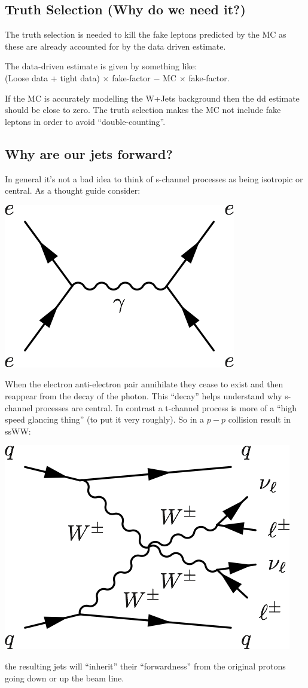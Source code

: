 \documentclass{article}
\begin{document}
\subsection{Truth Selection (Why do we need it?)}
The truth selection is needed to kill the fake leptons predicted by the MC as these are already accounted for by the data driven estimate.

The data-driven estimate is given by something like:\\
(Loose data + tight data) $\times$ fake-factor $-$ MC $\times$ fake-factor.

If the MC is accurately modelling the W+Jets background then the dd estimate should be close to zero. The truth selection makes the MC not include fake leptons in order to avoid ``double-counting''.

\subsection{Why are our jets forward?}
In general it's not a bad idea to think of s-channel processes as being isotropic or central. As a thought guide consider:\\

\centerline{\includegraphics[scale=0.3]{s_channel.png}}

When the electron anti-electron pair annihilate they cease to exist and then reappear from the decay of the photon. This ``decay'' helps understand why s-channel processes are central. In contrast a t-channel process is more of a ``high speed glancing thing'' (to put it very roughly). So in a $p-p$ collision result in ssWW:\\

\centerline{\includegraphics[scale=0.3]{signal.png}}

the resulting jets will ``inherit'' their ``forwardness'' from the original protons going down or up the beam line.
\end{document}
